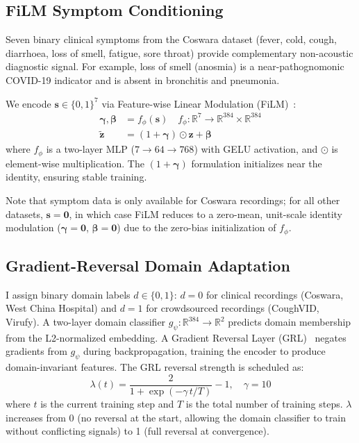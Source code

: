 \documentclass[10pt,journal,compsoc]{IEEEtran}
\begin{document}
\subsection{FiLM Symptom Conditioning}
\label{sec:film}

Seven binary clinical symptoms from the Coswara dataset
(fever, cold, cough, diarrhoea, loss of smell, fatigue, sore throat)
provide complementary non-acoustic diagnostic signal.
For example, loss of smell (anosmia) is a near-pathognomonic COVID-19
indicator and is absent in bronchitis and pneumonia.

We encode $\mathbf{s} \in \{0,1\}^7$ via Feature-wise Linear Modulation
(FiLM)~\cite{film}:
\begin{align}
\boldsymbol{\gamma}, \boldsymbol{\beta} &= f_\phi(\mathbf{s})
  \quad f_\phi: \mathbb{R}^7 \rightarrow \mathbb{R}^{384} \times \mathbb{R}^{384}
\label{eq:film_mlp} \\
\tilde{\mathbf{z}} &= (1 + \boldsymbol{\gamma}) \odot \mathbf{z} + \boldsymbol{\beta}
\label{eq:film_apply}
\end{align}
where $f_\phi$ is a two-layer MLP ($7 \rightarrow 64 \rightarrow 768$)
with GELU activation, and $\odot$ is element-wise multiplication.
The $(1 + \boldsymbol{\gamma})$ formulation initializes near the identity,
ensuring stable training.

Note that symptom data is only available for Coswara recordings;
for all other datasets, $\mathbf{s} = \mathbf{0}$, in which case
FiLM reduces to a zero-mean, unit-scale identity modulation
($\boldsymbol{\gamma} = \mathbf{0}$, $\boldsymbol{\beta} = \mathbf{0}$)
due to the zero-bias initialization of $f_\phi$.

\subsection{Gradient-Reversal Domain Adaptation}
\label{sec:grl}

I assign binary domain labels $d \in \{0, 1\}$:
$d=0$ for clinical recordings (Coswara, West China Hospital) and
$d=1$ for crowdsourced recordings (CoughVID, Virufy).
A two-layer domain classifier $g_\psi: \mathbb{R}^{384} \rightarrow
\mathbb{R}^2$ predicts domain membership from the L2-normalized embedding.
A Gradient Reversal Layer (GRL)~\cite{dann} negates gradients from $g_\psi$
during backpropagation, training the encoder to produce domain-invariant
features. The GRL reversal strength is scheduled as:
\begin{equation}
\lambda(t) = \frac{2}{1 + \exp\!\left(-\gamma\, t/T\right)} - 1,
\quad \gamma = 10
\label{eq:grl_schedule}
\end{equation}
where $t$ is the current training step and $T$ is the total number of
training steps. $\lambda$ increases from 0 (no reversal at the start,
allowing the domain classifier to train without conflicting signals)
to 1 (full reversal at convergence).
\end{document}
